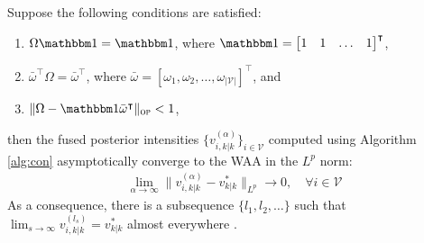 \begin{theorem}
Suppose the following conditions are satisfied:
\begin{enumerate}
\item $\Omega \mathbbm 1 = \mathbbm 1$, where $\mathbbm 1 = \begin{bmatrix}
1 & 1 & \dots & 1\end{bmatrix}^\intercal$,
%
\item $\bar \omega^\intercal \Omega = \bar \omega^\intercal$, where $\bar \omega  = [\omega _1, \omega _2, \dots, \omega _{|\mathcal V|}]^\intercal$, and
%
\item $\|{\Omega - \mathbbm 1 \bar{\omega}^\intercal} \|_{\textsc{op}} < 1$,
\end{enumerate}
then 
the fused posterior intensities $\lbrace v_{i,k|k}^{(\alpha)} \rbrace_{i\in \mathcal V}$ computed using Algorithm \ref{alg:con}
asymptotically converge to the WAA in the $L^p$ norm:
\begin{align}
   \lim_{\alpha\rightarrow \infty} \| v^{(\alpha)}_{i,k|k} - v^{*}_{k|k}\|_{L^p} \rightarrow 0, \quad \forall i\in\mathcal V
    \label{eq:convergence}
\end{align}
As a consequence, there is a subsequence $\lbrace l_1, l_2, \dots \rbrace$ such that $\lim_{s\rightarrow \infty} v^{(l_s)}_{i,k|k} = v^{*}_{k|k}$ almost everywhere \cite[p. 75]{bartle2014elements}.
\end{theorem}
